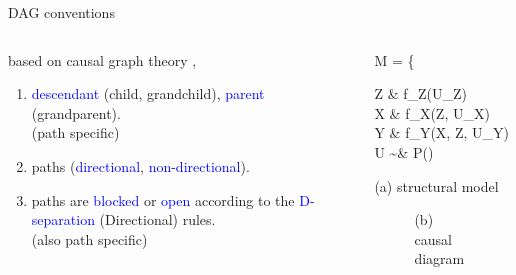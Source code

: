 %
%
\begin{frame}
	{DAG conventions}
	\begin{columns}
		\begin{column}{0.5\textwidth}
			based on causal graph theory \cite{Pearl_1988, Pearl_2009, Pearl_et_al_2016, Pearl_et_al_2018, Spirtes_et_al_1991},
			\begin{enumerate}
				\item \textcolor{blue}{descendant} (child, grandchild), \textcolor{blue}{parent} (grandparent). \\
				{\small \alert{(path specific)} }
				\item paths (\textcolor{blue}{directional}, \textcolor{blue}{non-directional}).
				\item paths are \textcolor{blue}{blocked} or \textcolor{blue}{open} according to the \textcolor{blue}{D-separation} (Directional) rules. \\
				{\small \alert{(also path specific)} }
			\end{enumerate}
		\end{column}
		\begin{column}{0.5\textwidth}  
			\begin{equ}
				M = \left\{ \begin{aligned} 
					Z \leftarrow & \; f_{Z}(U_{Z}) \\
					X \leftarrow & \; f_{X}(Z, U_{X}) \\
					Y \leftarrow & \; f_{Y}(X, Z, U_{Y}) \\
					U \sim & \; P()
				\end{aligned} \right
				\caption*{(a) structural model}
			\end{equ}
			\begin{figure}
				\caption*{(b) causal diagram}
			\end{figure}
		\end{column}
	\end{columns}
\end{frame}
